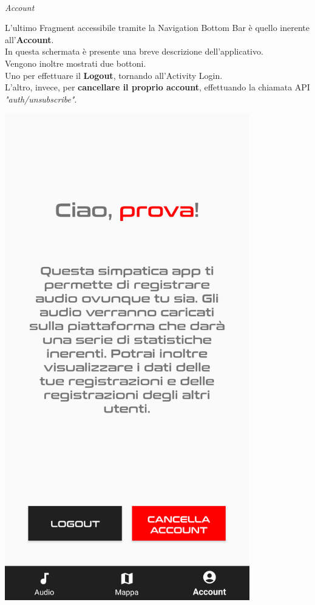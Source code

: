\documentclass{article}
\begin{document}
\quad \vspace*{20pt}\\
\textit{Account}\\
\begin{minipage}[t]{0.6\textwidth}
    \raggedright
    \vspace*{20pt}
    L'ultimo Fragment accessibile tramite la Navigation Bottom Bar è quello inerente all'\textbf{Account}.\\
    In questa schermata è presente una breve descrizione dell'applicativo.\vspace*{14pt}\\
    Vengono inoltre mostrati due bottoni.\\
    Uno per effettuare il \textbf{Logout}, tornando all'Activity Login.\\
    L'altro, invece, per \textbf{cancellare il proprio account}, effettuando la chiamata API \textit{"auth/unsubscribe"}.
\end{minipage}
\hfill
\begin{minipage}[t]{0.35\textwidth}
    \centering
    \vspace*{10pt}
    \includegraphics[width=0.8\textwidth]{account.png}\vspace*{40pt}
\end{minipage}
\end{document}
